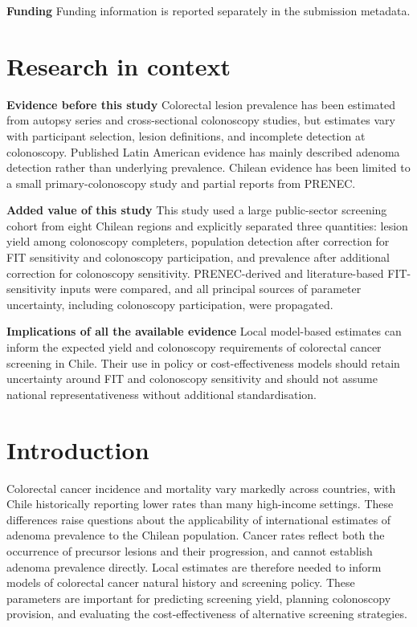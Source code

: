 \documentclass[10pt,a4paper]{article}
\begin{document}
\textbf{Funding}\quad
Funding information is reported separately in the submission metadata.

\section*{Research in context}

\textbf{Evidence before this study}\quad
Colorectal lesion prevalence has been estimated from autopsy series and
cross-sectional colonoscopy studies, but estimates vary with participant
selection, lesion definitions, and incomplete detection at colonoscopy.
Published Latin American evidence has mainly described adenoma detection
rather than underlying prevalence. Chilean evidence has been limited to a
small primary-colonoscopy study and partial reports from PRENEC.

\textbf{Added value of this study}\quad
This study used a large public-sector screening cohort from eight Chilean
regions and explicitly separated three quantities: lesion yield among
colonoscopy completers, population detection after correction for FIT
sensitivity and colonoscopy participation, and prevalence after additional
correction for colonoscopy sensitivity. PRENEC-derived and literature-based
FIT-sensitivity inputs were compared, and all principal sources of parameter
uncertainty, including colonoscopy participation, were propagated.

\textbf{Implications of all the available evidence}\quad
Local model-based estimates can inform the expected yield and colonoscopy
requirements of colorectal cancer screening in Chile. Their use in policy or
cost-effectiveness models should retain uncertainty around FIT and
colonoscopy sensitivity and should not assume national representativeness
without additional standardisation.

\section*{Introduction}

Colorectal cancer incidence and mortality vary markedly across countries,
with Chile historically reporting lower rates than many high-income
settings.\cite{Arnold2017,IARC2026} These differences raise questions about
the applicability of international estimates of adenoma prevalence to the
Chilean population. Cancer rates reflect both the occurrence of precursor
lesions and their progression, and cannot establish adenoma prevalence
directly. Local estimates are therefore needed to inform models of colorectal
cancer natural history and screening policy. These parameters are important
for predicting screening yield, planning colonoscopy provision, and
evaluating the cost-effectiveness of alternative screening strategies.
\end{document}
